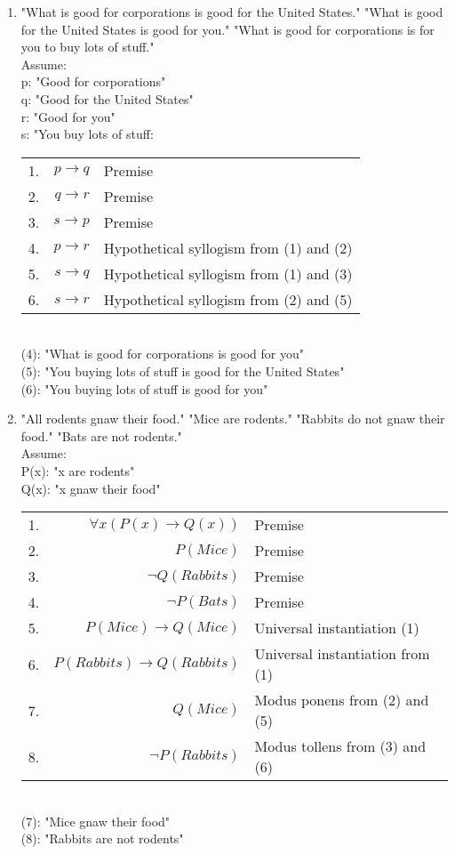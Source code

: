 \documentclass[12pt,en,a4paper]{report}
\begin{document}
\begin{enumerate}[label=\textbf{\alph*)}]
		(5): "Ralph is not a computer science major"
		\item "What is good for corporations is good for the United States." "What is good for the United States is good for you." "What is good for corporations is for you to buy lots of stuff."\\
		
		Assume:\\
		p: "Good for corporations"\\
		q: "Good for the United States"\\
		r: "Good for you"\\
		s: "You buy lots of stuff:\\
		
		\begin{tabular}{r r l}
			1. & $p \rightarrow q$ & Premise\\
			2. & $q \rightarrow r$ & Premise\\
			3. & $s \rightarrow p$ & Premise\\
			4. & $p \rightarrow r$ & Hypothetical syllogism from (1) and (2)\\
			5. & $s \rightarrow q$ & Hypothetical syllogism from (1) and (3)\\
			6. & $s \rightarrow r$ & Hypothetical syllogism from (2) and (5)\\
		\end{tabular}\\
	
		(4): "What is good for corporations is good for you"\\
		(5): "You buying lots of stuff is good for the United States"\\
		(6): "You buying lots of stuff is good for you"
		\item "All rodents gnaw their food." "Mice are rodents." "Rabbits do not gnaw their food." "Bats are not rodents."\\
		
		Assume:\\
		P(x): "x are rodents"\\
		Q(x): "x gnaw their food"\\
		
		\begin{tabular}{r r l}
			1. & $\forall x (P(x) \rightarrow Q(x))$ & Premise\\
			2. & $P(Mice)$ & Premise\\
			3. & $\neg Q(Rabbits)$ & Premise\\
			4. & $\neg P(Bats)$ & Premise\\
			5. & $P(Mice) \rightarrow Q(Mice)$ & Universal instantiation (1)\\
			6. & $P(Rabbits) \rightarrow Q(Rabbits)$ & Universal instantiation from (1)\\
			7. & $Q(Mice)$ & Modus ponens from (2) and (5)\\
			8. & $\neg P(Rabbits)$ & Modus tollens from (3) and (6)
		\end{tabular}\\
	
	(7): "Mice gnaw their food"\\
	(8): "Rabbits are not rodents"
	\end{enumerate}
\end{document}
